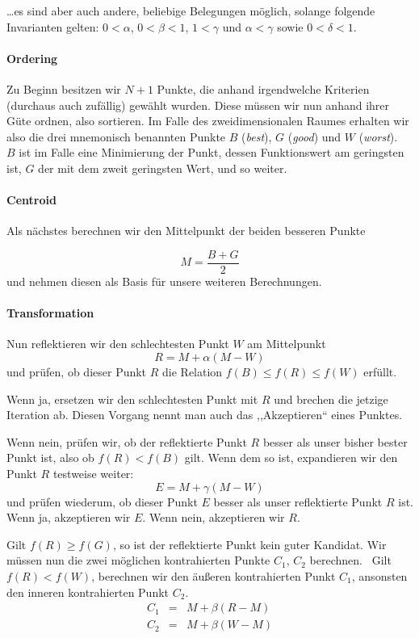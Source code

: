 \documentclass[naustrian]{article}
\begin{document}
\dots es sind aber auch andere, beliebige Belegungen möglich, solange
folgende Invarianten gelten: $0 < \alpha$, $0 < \beta < 1$, $1 < \gamma$ und $\alpha < \gamma$
sowie $0 < \delta < 1$.~\cite{nelder-mead-scholarpedia}

\paragraph{Ordering}

Zu Beginn besitzen wir $N+1$ Punkte, die anhand irgendwelche Kriterien
(durchaus auch zufällig) gewählt wurden. Diese müssen wir nun anhand
ihrer Güte ordnen, also sortieren. Im Falle des zweidimensionalen
Raumes erhalten wir also die drei mnemonisch benannten Punkte \textbf{$B$
}(\emph{best}), $G$ (\emph{good}) und $W$ (\emph{worst}).~\cite{nelder-mead-unknown} $B$ ist
im Falle eine Minimierung der Punkt, dessen Funktionswert am geringsten
ist, $G$ der mit dem zweit geringsten Wert, und so weiter.


\paragraph{Centroid}

Als nächstes berechnen wir den Mittelpunkt der beiden besseren Punkte

\[
    M=\frac{B+G}{2}
\]
und nehmen diesen als Basis für unsere weiteren Berechnungen.


\paragraph{Transformation}

Nun reflektieren wir den schlechtesten Punkt $W$ am Mittelpunkt
\[
    R=M+\alpha(M-W)
\]
und prüfen, ob dieser Punkt $R$ die Relation $f(B)\leq f(R)\leq f(W)$
erfüllt.

Wenn ja, ersetzen wir den schlechtesten Punkt mit $R$ und brechen
die jetzige Iteration ab. Diesen Vorgang nennt man auch das ,,Akzeptieren``
eines Punktes.

Wenn nein, prüfen wir, ob der reflektierte Punkt $R$ besser als unser
bisher bester Punkt ist, also ob $f(R)<f(B)$ gilt. Wenn dem so ist,
expandieren wir den Punkt $R$ testweise weiter:
\[
    E=M+\gamma(M-W)
\]
und prüfen wiederum, ob dieser Punkt $E$ besser als unser reflektierte
Punkt $R$ ist. Wenn ja, akzeptieren wir $E$. Wenn nein, akzeptieren
wir $R$.

Gilt $f(R)\geq f(G)$, so ist der reflektierte Punkt kein guter Kandidat.  Wir
müssen nun die zwei möglichen kontrahierten
Punkte $C_{1}$, $C_{2}$
berechnen.~\cite{nelder-mead-scholarpedia,nelder-mead-unknown} Gilt $f(R)<f(W)$, berechnen wir den
äußeren kontrahierten Punkt $C_{1}$, ansonsten den inneren kontrahierten Punkt
$C_{2}.$
\begin{eqnarray*}
    C_{1} & = & M+\beta(R-M)\\
    C_{2} & = & M+\beta(W-M)
\end{eqnarray*}
\end{document}
